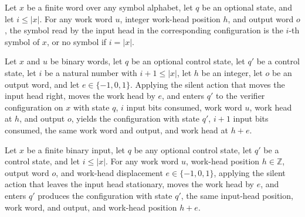 \begin{lemma}
\label{Complexity.taut_read}
\leanok
{}
Let $x$ be a finite word over any symbol alphabet, let $q$ be an optional state, and let
$i\le |x|$. For any work word $u$, integer work-head position $h$, and output word $o$,
the symbol read by the input head in the corresponding configuration is the $i$-th
symbol of $x$, or no symbol if $i=|x|$.
\end{lemma}

\begin{lemma}
\label{Complexity.taut_move_right}
\leanok
{}
Let $x$ and $u$ be binary words, let $q$ be an optional control state, let $q'$ be a
control state, let $i$ be a natural number with $i+1\le |x|$, let $h$ be an integer, let
$o$ be an output word, and let $e\in\{-1,0,1\}$. Applying the silent action that moves
the input head right, moves the work head by $e$, and enters $q'$ to the verifier
configuration on $x$ with state $q$, $i$ input bits consumed, work word $u$, work head
at $h$, and output $o$, yields the configuration with state $q'$, $i+1$ input bits
consumed, the same work word and output, and work head at $h+e$.
\end{lemma}

\begin{lemma}
\label{Complexity.taut_move_stay}
\leanok
{}
Let $x$ be a finite binary input, let $q$ be any optional control state, let $q'$ be a
control state, and let $i\le |x|$. For any work word $u$, work-head position
$h\in\mathbb Z$, output word $o$, and work-head displacement $e\in\{-1,0,1\}$, applying
the silent action that leaves the input head stationary, moves the work head by $e$, and
enters $q'$ produces the configuration with state $q'$, the same input-head position,
work word, and output, and work-head position $h+e$.
\end{lemma}

